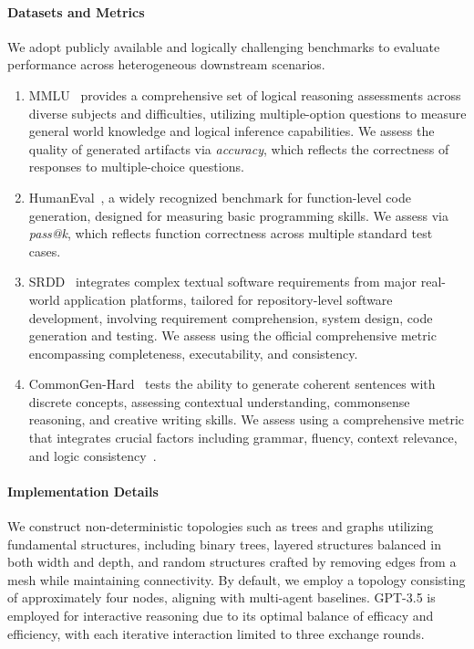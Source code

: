 \documentclass{article}
\begin{document}
\paragraph{Datasets and Metrics}
We adopt publicly available and logically challenging benchmarks to evaluate performance across heterogeneous downstream scenarios.
\begin{enumerate}[$\bullet$]
\setlength{\itemsep}{0pt}
\setlength{\parsep}{0pt}
\item  MMLU~\citep{Hendrycks2020MeasuringMM} provides a comprehensive set of logical reasoning assessments across diverse subjects and difficulties, utilizing multiple-option questions to measure general world knowledge and logical inference capabilities. We assess the quality of generated artifacts via \textit{accuracy}, which reflects the correctness of responses to multiple-choice questions.
\item HumanEval~\citep{chen2021evaluating}, a widely recognized benchmark for function-level code generation, designed for measuring basic programming skills. We assess via \textit{pass@k}, which reflects function correctness across multiple standard test cases.
\item SRDD~\citep{qian2023communicative} integrates complex textual software requirements from major real-world application platforms, tailored for repository-level software development, involving requirement comprehension, system design, code generation and testing. We assess using the official comprehensive metric encompassing completeness, executability, and consistency.
\item CommonGen-Hard~\citep{Madaan2023Self} tests the ability to generate coherent sentences with discrete concepts, assessing contextual understanding, commonsense reasoning, and creative writing skills. We assess using a comprehensive metric that integrates crucial factors including grammar, fluency, context relevance, and logic consistency~\citep{li2018generating}.
\end{enumerate}

\paragraph{Implementation Details}\label{Implementation Details}
We construct non-deterministic topologies such as trees and graphs utilizing fundamental structures, including binary trees, layered structures balanced in both width and depth, and random structures crafted by removing edges from a mesh while maintaining connectivity. 
By default, we employ a topology consisting of approximately four nodes, aligning with multi-agent baselines. 
GPT-3.5 is employed for interactive reasoning due to its optimal balance of efficacy and efficiency, with each iterative interaction limited to three exchange rounds.
\end{document}

